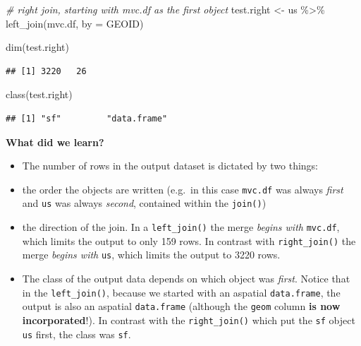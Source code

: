 \documentclass[
]{book}
\newenvironment{Shaded}{\begin{snugshade}}{\end{snugshade}}
\newcommand{\AttributeTok}[1]{\textcolor[rgb]{0.77,0.63,0.00}{#1}}
\newcommand{\CommentTok}[1]{\textcolor[rgb]{0.56,0.35,0.01}{\textit{#1}}}
\newcommand{\FunctionTok}[1]{\textcolor[rgb]{0.00,0.00,0.00}{#1}}
\newcommand{\NormalTok}[1]{#1}
\newcommand{\OtherTok}[1]{\textcolor[rgb]{0.56,0.35,0.01}{#1}}
\newcommand{\SpecialCharTok}[1]{\textcolor[rgb]{0.00,0.00,0.00}{#1}}
\newcommand{\StringTok}[1]{\textcolor[rgb]{0.31,0.60,0.02}{#1}}
\providecommand{\tightlist}{%
  \setlength{\itemsep}{0pt}\setlength{\parskip}{0pt}}
\begin{document}
\begin{Shaded}
\begin{Highlighting}[]
\CommentTok{\# right join, starting with mvc.df as the first object}
\NormalTok{test.right }\OtherTok{\textless{}{-}}\NormalTok{ us }\SpecialCharTok{\%\textgreater{}\%}
  \FunctionTok{left\_join}\NormalTok{(mvc.df, }\AttributeTok{by =} \StringTok{\textquotesingle{}GEOID\textquotesingle{}}\NormalTok{)}

\FunctionTok{dim}\NormalTok{(test.right)}
\end{Highlighting}
\end{Shaded}

\begin{verbatim}
## [1] 3220   26
\end{verbatim}

\begin{Shaded}
\begin{Highlighting}[]
\FunctionTok{class}\NormalTok{(test.right)}
\end{Highlighting}
\end{Shaded}

\begin{verbatim}
## [1] "sf"         "data.frame"
\end{verbatim}

\textbf{What did we learn?}

\begin{itemize}
\tightlist
\item
  The number of rows in the output dataset is dictated by two things:
\item
  the order the objects are written (e.g.~in this case \texttt{mvc.df} was always \emph{first} and \texttt{us} was always \emph{second}, contained within the \texttt{join()})
\item
  the direction of the join. In a \texttt{left\_join()} the merge \emph{begins with} \texttt{mvc.df}, which limits the output to only 159 rows. In contrast with \texttt{right\_join()} the merge \emph{begins with} \texttt{us}, which limits the output to 3220 rows.
\item
  The class of the output data depends on which object was \emph{first}. Notice that in the \texttt{left\_join()}, because we started with an aspatial \texttt{data.frame}, the output is also an aspatial \texttt{data.frame} (although the \texttt{geom} column \textbf{is now incorporated}!). In contrast with the \texttt{right\_join()} which put the \texttt{sf} object \texttt{us} first, the class was \texttt{sf}.
\end{itemize}
\end{document}
